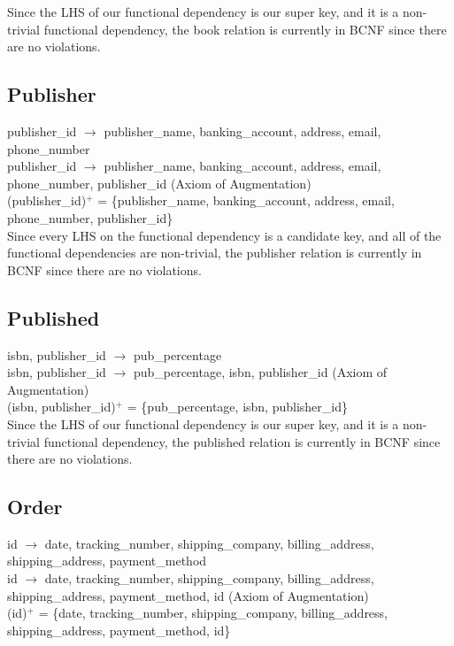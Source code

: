 \documentclass{article}
\begin{document}
    \noindent Since the LHS of our functional dependency is our super key, and it is a non-trivial functional dependency, the book relation is currently in BCNF since there are no violations.

    \subsection{Publisher}
    publisher\_id $\rightarrow$ publisher\_name, banking\_account, address, email, phone\_number \\
    publisher\_id $\rightarrow$ publisher\_name, banking\_account, address, email, phone\_number, publisher\_id (Axiom of Augmentation) \\
    (publisher\_id)$^+$ = \{publisher\_name, banking\_account, address, email, phone\_number, publisher\_id\} \\
    \noindent Since every LHS on the functional dependency is a candidate key, and all of the functional dependencies are non-trivial, the publisher relation is currently in BCNF since there are no violations.
    
    \subsection{Published}
    
    \noindent isbn, publisher\_id $\rightarrow$ pub\_percentage \\
    \noindent isbn, publisher\_id $\rightarrow$ pub\_percentage, isbn, publisher\_id (Axiom of Augmentation) \\
    (isbn, publisher\_id)$^+$ = \{pub\_percentage, isbn, publisher\_id\} \\
    
    \noindent Since the LHS of our functional dependency is our super key, and it is a non-trivial functional dependency, the published relation is currently in BCNF since there are no violations.
    
    \subsection{Order}
    id $\rightarrow$ date, tracking\_number, shipping\_company, billing\_address, shipping\_address, payment\_method \\
    id $\rightarrow$ date, tracking\_number, shipping\_company, billing\_address, shipping\_address, payment\_method, id (Axiom of Augmentation)\\
    (id)$^+$ = \{date, tracking\_number, shipping\_company, billing\_address, shipping\_address, payment\_method, id\} \\
    
\end{document}
